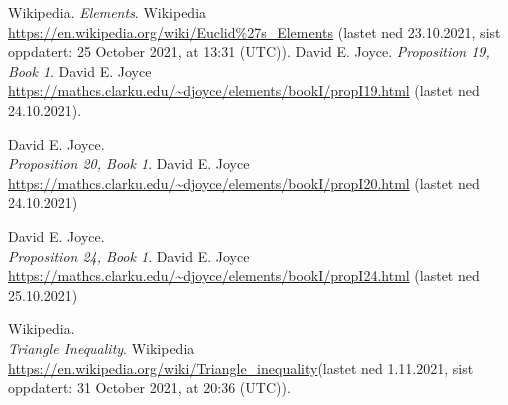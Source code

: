 \begin{thebibliography}{5}
    Wikipedia.
    \textit{Elements}. Wikipedia\\
    \url{https://en.wikipedia.org/wiki/Euclid%27s_Elements} (lastet ned 23.10.2021, sist oppdatert: 25 October 2021, at 13:31 (UTC)).
    David E. Joyce. 
    \textit{Proposition 19, Book 1}. David E. Joyce \\
    \url{https://mathcs.clarku.edu/~djoyce/elements/bookI/propI19.html} (lastet ned 24.10.2021).
    
    David E. Joyce.\\
    \textit{Proposition 20, Book 1}. David E. Joyce\\
    \url{https://mathcs.clarku.edu/~djoyce/elements/bookI/propI20.html} (lastet ned 24.10.2021)
    
    David E. Joyce.\\  
    \textit{Proposition 24, Book 1}.
    David E. Joyce\\
    \url{https://mathcs.clarku.edu/~djoyce/elements/bookI/propI24.html} (lastet ned 25.10.2021)
   
    Wikipedia.\\  
    \textit{Triangle Inequality}.
    Wikipedia\\
    \url{https://en.wikipedia.org/wiki/Triangle_inequality}(lastet ned 1.11.2021, sist oppdatert:  31 October 2021, at 20:36 (UTC)).

    
    
\end{thebibliography}